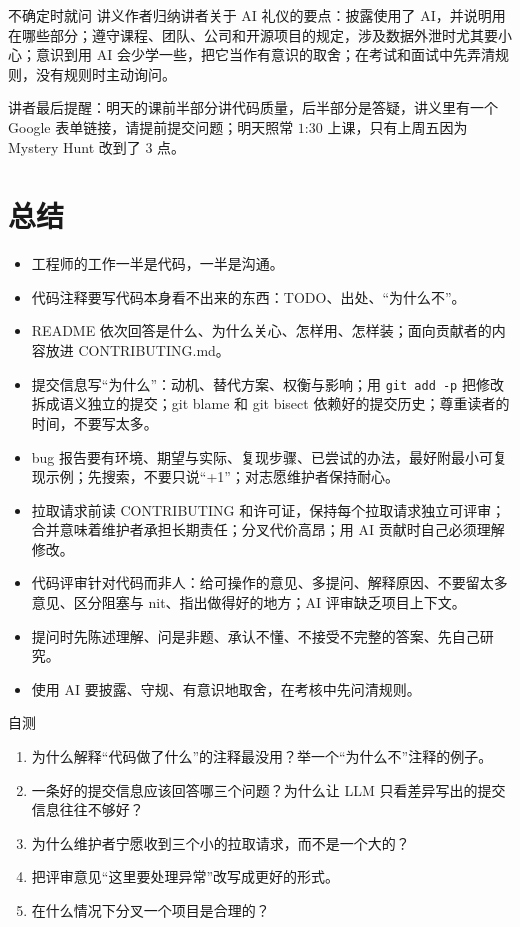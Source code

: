 \documentclass[a4paper]{article}
\begin{document}
\begin{warningbox}{不确定时就问}
讲义作者归纳讲者关于 AI 礼仪的要点：披露使用了 AI，并说明用在哪些部分；遵守课程、团队、公司和开源项目的规定，涉及数据外泄时尤其要小心；意识到用 AI 会少学一些，把它当作有意识的取舍；在考试和面试中先弄清规则，没有规则时主动询问。
\end{warningbox}

讲者最后提醒：明天的课前半部分讲代码质量，后半部分是答疑，讲义里有一个 Google 表单链接，请提前提交问题；明天照常 $1$:$30$ 上课，只有上周五因为 Mystery Hunt 改到了 3 点。

\section{总结}

\begin{itemize}
\item 工程师的工作一半是代码，一半是沟通。
\item 代码注释要写代码本身看不出来的东西：TODO、出处、“为什么不”。
\item README 依次回答是什么、为什么关心、怎样用、怎样装；面向贡献者的内容放进 CONTRIBUTING.md。
\item 提交信息写“为什么”：动机、替代方案、权衡与影响；用 \texttt{git add -p} 把修改拆成语义独立的提交；git blame 和 git bisect 依赖好的提交历史；尊重读者的时间，不要写太多。
\item bug 报告要有环境、期望与实际、复现步骤、已尝试的办法，最好附最小可复现示例；先搜索，不要只说“+1”；对志愿维护者保持耐心。
\item 拉取请求前读 CONTRIBUTING 和许可证，保持每个拉取请求独立可评审；合并意味着维护者承担长期责任；分叉代价高昂；用 AI 贡献时自己必须理解修改。
\item 代码评审针对代码而非人：给可操作的意见、多提问、解释原因、不要留太多意见、区分阻塞与 nit、指出做得好的地方；AI 评审缺乏项目上下文。
\item 提问时先陈述理解、问是非题、承认不懂、不接受不完整的答案、先自己研究。
\item 使用 AI 要披露、守规、有意识地取舍，在考核中先问清规则。
\end{itemize}

\begin{practicebox}{自测}
\begin{enumerate}
\item 为什么解释“代码做了什么”的注释最没用？举一个“为什么不”注释的例子。
\item 一条好的提交信息应该回答哪三个问题？为什么让 LLM 只看差异写出的提交信息往往不够好？
\item 为什么维护者宁愿收到三个小的拉取请求，而不是一个大的？
\item 把评审意见“这里要处理异常”改写成更好的形式。
\item 在什么情况下分叉一个项目是合理的？
\end{enumerate}
\end{practicebox}
\end{document}
